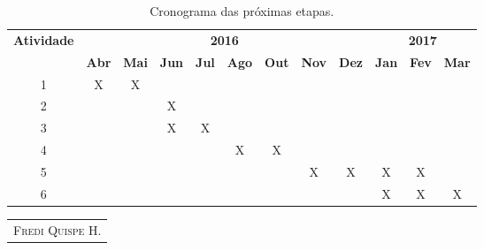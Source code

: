\documentclass[a4paper, 11pt]{article}
\begin{document}
\begin{table}[H]
\centering
\begin{tabular}{cccccccccccc}
\toprule \multirow{2}{*}{\textbf{Atividade}}& \multicolumn{8}{c}{\textbf{2016}} & \multicolumn{3}{c}{\textbf{2017}} \\ \cline{2-12}
  & \textbf{Abr} & \textbf{Mai} & \textbf{Jun} & \textbf{Jul} & \textbf{Ago} & \textbf{Out} & \textbf{Nov} & \textbf{Dez} & \textbf{Jan} & \textbf{Fev} & \textbf{Mar}\\ \midrule 
1 & X & X &   &   &   &   &   &   &   &   &   \\ 
2 &   &   & X &   &   &   &   &   &   &   &   \\
3 &   &   & X & X &   &   &   &   &   &   &   \\ 
4 &   &   &   &   & X & X &   &   &   &   &   \\
5 &   &   &   &   &   &   & X & X & X & X &   \\
6 &   &   &   &   &   &   &   &   & X & X & X \\ \bottomrule
\end{tabular}
\caption{Cronograma das pr\'oximas etapas.}
\label{tab:cronograma}
\end{table}
 
\newpage

 
\vfill \hfill
\begin{tabular}{c}

\\ \hline
\textsc{Fredi Quispe H.}
\end{tabular}
\end{document}
